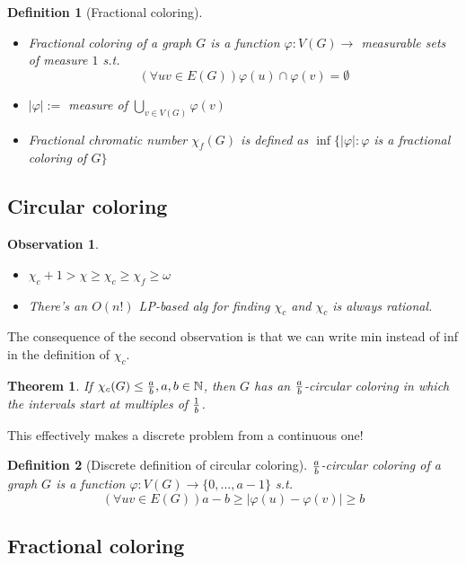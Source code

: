 \documentclass{article}
\newtheorem*{theorem}{Theorem}
\newtheorem*{definition}{Definition}
\newtheorem*{observation}{Observation}
\begin{document}
\begin{definition}[Fractional coloring]
	~
	\begin{itemize}
		\item \emph{Fractional coloring} of a graph $G$ is a function
			$\varphi: V(G) \rightarrow$ measurable sets of measure
			$1$ s.t. $$ (\forall uv \in E(G)) \varphi(u) \cap
			\varphi(v) = \emptyset $$
		\item $|\varphi| :=$ measure of $\bigcup_{v \in V(G)}
			\varphi(v)$
		\item \emph{Fractional chromatic number} $\chi_f(G)$ is defined
			as $\inf\{|\varphi|: \varphi$ is a fractional coloring
			of $G\}$
	\end{itemize}
\end{definition}

\subsection*{Circular coloring}

\begin{observation}
	~
	\begin{itemize}
		\item $\chi_c + 1 > \chi \ge \chi_c \ge \chi_f \ge \omega$
		\item There's an $O(n!)$ LP-based alg for finding $\chi_c$ and
			$\chi_c$ is always rational.
	\end{itemize}
\end{observation}

\noindent
The consequence of the second observation is that we can write min instead of
inf in the definition of $\chi_c$.

\begin{theorem}
	If $\chi_c(G) \le {a \over b}, a,b \in \mathbb{N}$, then $G$ has an $a
	\over b$-circular coloring in which the intervals start at multiples of
	$1 \over b$.
\end{theorem}

\noindent
This effectively makes a discrete problem from a continuous one!

\begin{definition}[Discrete definition of circular coloring]
	\emph{$a \over b$-circular coloring} of a graph $G$ is a function
	$\varphi: V(G) \rightarrow \{0, ..., a-1\}$ s.t.
	$$(\forall uv \in E(G)) a - b \ge | \varphi(u) - \varphi(v) | \ge b $$
\end{definition}

\subsection*{Fractional coloring}
\end{document}
